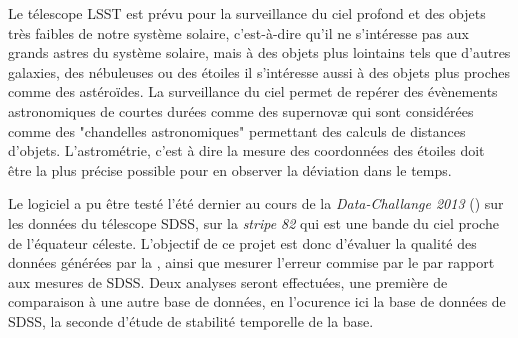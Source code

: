 Le télescope LSST est prévu pour la surveillance du ciel profond et des objets très faibles de notre système solaire, c'est-à-dire qu'il ne s'intéresse pas aux grands astres du système solaire, mais à des objets plus lointains tels que d'autres galaxies, des nébuleuses ou des étoiles il s'intéresse aussi à des objets plus proches comme des astéroïdes. La surveillance du ciel permet de repérer des évènements astronomiques de courtes durées comme des supernovæ qui sont considérées comme des "chandelles astronomiques" permettant des calculs de distances d'objets. L'astrométrie, c'est à dire la mesure des coordonnées des étoiles doit être la plus précise possible pour en observer la déviation dans le temps.

Le logiciel \stack{} a pu être testé l'été dernier au cours de la \emph{Data-Challange 2013} (\DC) sur les données du télescope SDSS, sur la \emph{stripe 82} qui est une bande du ciel proche de l'équateur céleste. L'objectif de ce projet est donc d'évaluer la qualité des données générées par la \DC, ainsi que mesurer l'erreur commise par le \stack{} par rapport aux mesures de SDSS. Deux analyses seront effectuées, une première de comparaison à une autre base de données, en l'ocurence ici la base de données de SDSS, la seconde d'étude de stabilité temporelle de la base.

